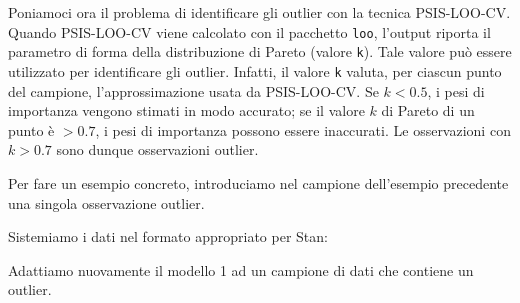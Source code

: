 \documentclass[
  10pt,
  italian,
  a4paper,
  extrafontsizes,onecolumn,openright
  ]{memoir}
\newenvironment{Shaded}{\begin{snugshade}}{\end{snugshade}}
\newcommand{\AttributeTok}[1]{\textcolor[rgb]{0.77,0.63,0.00}{#1}}
\newcommand{\CommentTok}[1]{\textcolor[rgb]{0.56,0.35,0.01}{\textit{#1}}}
\newcommand{\DecValTok}[1]{\textcolor[rgb]{0.00,0.00,0.81}{#1}}
\newcommand{\FunctionTok}[1]{\textcolor[rgb]{0.00,0.00,0.00}{#1}}
\newcommand{\NormalTok}[1]{#1}
\newcommand{\OtherTok}[1]{\textcolor[rgb]{0.56,0.35,0.01}{#1}}
\newcommand{\SpecialCharTok}[1]{\textcolor[rgb]{0.00,0.00,0.00}{#1}}
\theoremstyle{definition}
\theoremstyle{definition}
\theoremstyle{definition}
\theoremstyle{definition}
\theoremstyle{remark}
\begin{document}
Poniamoci ora il problema di identificare gli outlier con la tecnica PSIS-LOO-CV. Quando PSIS-LOO-CV viene calcolato con il pacchetto \texttt{loo}, l'output riporta il parametro di forma della distribuzione di Pareto (valore \texttt{k}). Tale valore può essere utilizzato per identificare gli outlier. Infatti, il valore \texttt{k} valuta, per ciascun punto del campione, l'approssimazione usata da PSIS-LOO-CV. Se \(k < 0.5\), i pesi di importanza vengono stimati in modo accurato; se il valore \(k\) di Pareto di un punto è \(> 0.7\), i pesi di importanza possono essere inaccurati. Le osservazioni con \(k > 0.7\) sono dunque osservazioni outlier.

Per fare un esempio concreto, introduciamo nel campione dell'esempio precedente una singola osservazione outlier.

\begin{Shaded}
\end{Shaded}

\noindent
Sistemiamo i dati nel formato appropriato per Stan:

\begin{Shaded}
\end{Shaded}

\noindent
Adattiamo nuovamente il modello 1 ad un campione di dati che contiene un outlier.

\begin{Shaded}
\end{Shaded}
\end{document}
